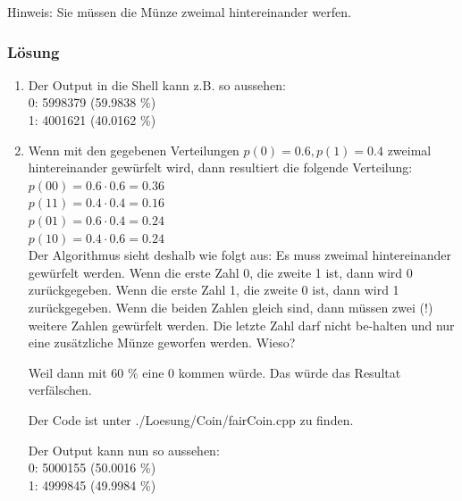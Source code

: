 Hinweis: Sie müssen die Münze zweimal hintereinander werfen.

\subsubsection{Lösung}

\begin{enumerate}
  \item Der Output in die Shell kann z.B. so aussehen: \\ 0: 5998379 (59.9838 \%) \\ 1: 4001621 (40.0162 \%)
  \item Wenn mit den gegebenen Verteilungen $p(0) = 0.6, p(1) = 0.4$ zweimal hintereinander gewürfelt wird, dann resultiert die folgende Verteilung:
  \\
  $p(00) = 0.6 \cdot 0.6 = 0.36$ \\
  $ p(11) = 0.4 \cdot 0.4 = 0.16$ \\
  $  p(01) = 0.6\cdot 0.4 = 0.24$ \\
   $p(10) = 0.4 \cdot 0.6 = 0.24$\\
Der Algorithmus sieht deshalb wie folgt aus: Es muss zweimal hintereinander gewürfelt werden. Wenn die erste Zahl 0, die zweite 1 ist, dann wird 0 zurückgegeben. Wenn die erste Zahl 1, die zweite 0 ist, dann wird 1 zurückgegeben. Wenn die beiden Zahlen gleich sind, dann müssen zwei (!) weitere Zahlen gewürfelt werden. Die letzte Zahl darf nicht be-halten und nur eine zusätzliche Münze geworfen werden. Wieso?

Weil dann mit 60 \% eine 0 kommen würde. Das würde das Resultat verfälschen.

Der Code ist unter ./Loesung/Coin/fairCoin.cpp zu finden.

Der Output kann nun so aussehen: \\ 0: 5000155 (50.0016 \%) \\ 1: 4999845 (49.9984 \%)
\end{enumerate}


